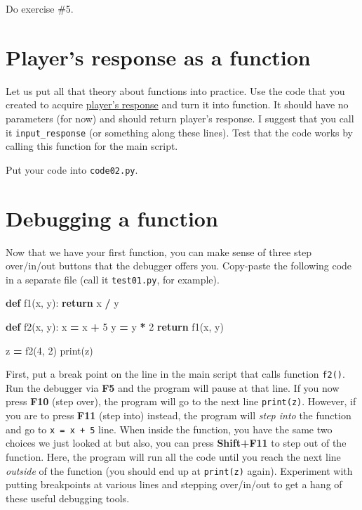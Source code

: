 \documentclass[
]{book}
\newenvironment{Shaded}{\begin{snugshade}}{\end{snugshade}}
\newcommand{\BuiltInTok}[1]{#1}
\newcommand{\ControlFlowTok}[1]{\textcolor[rgb]{0.13,0.29,0.53}{\textbf{#1}}}
\newcommand{\DecValTok}[1]{\textcolor[rgb]{0.00,0.00,0.81}{#1}}
\newcommand{\KeywordTok}[1]{\textcolor[rgb]{0.13,0.29,0.53}{\textbf{#1}}}
\newcommand{\NormalTok}[1]{#1}
\newcommand{\OperatorTok}[1]{\textcolor[rgb]{0.81,0.36,0.00}{\textbf{#1}}}
\begin{document}
Do exercise \#5.

\hypertarget{players-response-as-a-function}{%
\section{Player's response as a function}\label{players-response-as-a-function}}

Let us put all that theory about functions into practice. Use the code that you created to acquire \protect\hyperlink{guess-the-number-players-response}{player's response} and turn it into function. It should have no parameters (for now) and should return player's response. I suggest that you call it \texttt{input\_response} (or something along these lines). Test that the code works by calling this function for the main script.

Put your code into \texttt{code02.py}.

\hypertarget{debugging-a-function}{%
\section{Debugging a function}\label{debugging-a-function}}

Now that we have your first function, you can make sense of three step over/in/out buttons that the debugger offers you. Copy-paste the following code in a separate file (call it \texttt{test01.py}, for example).

\begin{Shaded}
\begin{Highlighting}[]
\KeywordTok{def}\NormalTok{ f1(x, y):}
  \ControlFlowTok{return}\NormalTok{ x }\OperatorTok{/}\NormalTok{ y}
  
\KeywordTok{def}\NormalTok{ f2(x, y):}
\NormalTok{  x }\OperatorTok{=}\NormalTok{ x }\OperatorTok{+} \DecValTok{5}
\NormalTok{  y }\OperatorTok{=}\NormalTok{ y }\OperatorTok{*} \DecValTok{2}
  \ControlFlowTok{return}\NormalTok{ f1(x, y)}
  
\NormalTok{z }\OperatorTok{=}\NormalTok{ f2(}\DecValTok{4}\NormalTok{, }\DecValTok{2}\NormalTok{)}
\BuiltInTok{print}\NormalTok{(z)}
\end{Highlighting}
\end{Shaded}

First, put a break point on the line in the main script that calls function \texttt{f2()}. Run the debugger via \textbf{F5} and the program will pause at that line. If you now press \textbf{F10} (step over), the program will go to the next line \texttt{print(z)}. However, if you are to press \textbf{F11} (step into) instead, the program will \emph{step into} the function and go to \texttt{x\ =\ x\ +\ 5} line. When inside the function, you have the same two choices we just looked at but also, you can press \textbf{Shift+F11} to step out of the function. Here, the program will run all the code until you reach the next line \emph{outside} of the function (you should end up at \texttt{print(z)} again). Experiment with putting breakpoints at various lines and stepping over/in/out to get a hang of these useful debugging tools.
\end{document}
